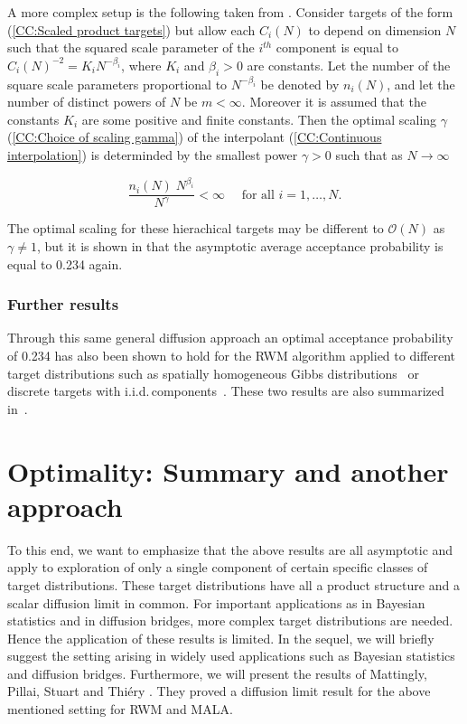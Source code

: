 A more complex setup is the following taken from \autocite{Bedard2007}. Consider targets of the form (\ref{CC:Scaled product targets}) but allow each $C_i(N)$ to depend on dimension $N$ such that the squared scale parameter of the $i^{th}$ component is equal to $ C_i(N)^{-2} = K_i  N^{-\beta_i} $, where $K_i$ and $\beta_i>0$ are constants. Let the number of the square scale parameters proportional to $N^{-\beta_i}$ be denoted by $ n_i(N) $, and let the number of distinct powers of $N$ be $m<\infty$. Moreover it is assumed that the constants $K_i$ are some positive and finite constants. Then the optimal scaling $\gamma$ (\ref{CC:Choice of scaling gamma}) of the interpolant (\ref{CC:Continuous interpolation}) is determinded by the smallest power $ \gamma > 0 $ such that as $N \to \infty$ 

\begin{equation}
 \frac{n_i(N) \; N^{\beta_i}}{N^{\gamma}} < \infty \quad \text{ for all } i = 1, \dots, N.
\end{equation}

The optimal scaling for these hierachical targets may be different to $\mathcal{O}(N)$ as $ \gamma \neq 1 $, but it is shown in \autocite{Bedard2007} that the asymptotic average acceptance probability is equal to 0.234 again.

\subsubsection{Further results}

Through this same general diffusion approach an optimal acceptance probability of 0.234 has also been shown to hold for the RWM algorithm applied to different target distributions such as spatially homogeneous Gibbs distributions~\autocite{Breyer2000} or discrete targets with i.i.d.\,components~\autocite{Roberts1998-2}.  These two results are also summarized in~\autocite{Roberts2001}.



\section{Optimality: Summary and another approach}

To this end, we want to emphasize that the above results are all asymptotic and apply to exploration of only a single component of certain specific classes of target distributions. These target distributions have all a product structure and a scalar diffusion limit in common. For important applications as in Bayesian statistics and in diffusion bridges, more complex target distributions are needed. Hence the application of these results is limited. In the sequel, we will briefly suggest the setting arising in widely used applications such as Bayesian statistics and diffusion bridges. Furthermore, we will present the results of Mattingly, Pillai, Stuart and Thi\'{e}ry \autocite{Mattingly2010, Pillai2012}. They proved a diffusion limit result for the above mentioned setting for RWM and MALA.

